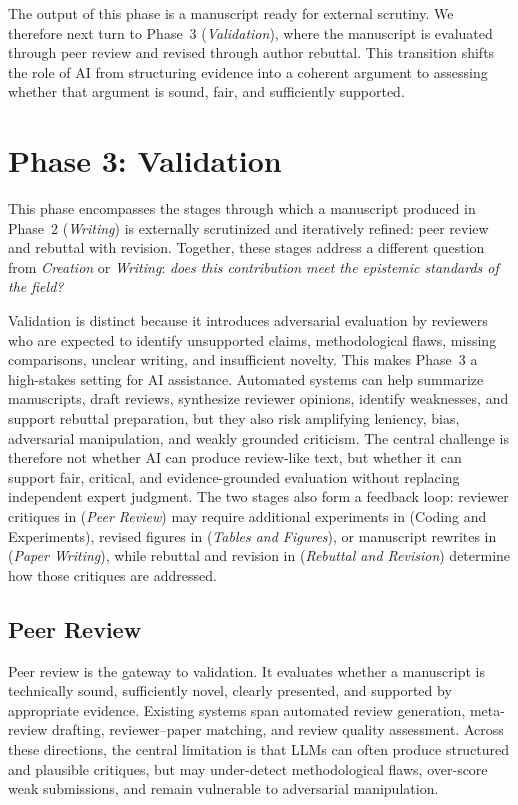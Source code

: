 \documentclass{llmxive}
\providecommand{\levelbadge}[2]{  \tcbox[on line, nobeforeafter, tcbox raise base,
         boxsep=0pt, left=2pt, right=2pt, top=0.5pt, bottom=0.5pt,
         arc=1.5pt, boxrule=0.3pt,
         colback=#1!15, colframe=#1!70]    {\scriptsize\bfseries\sffamily#2}}
\providecommand{\Sthree}{\texorpdfstring{\levelbadge{S3color}{S3}}{S3}\xspace}
\providecommand{\Sfour}{\texorpdfstring{\levelbadge{S4color}{S4}}{S4}\xspace}
\providecommand{\Sfive}{\texorpdfstring{\levelbadge{S5color}{S5}}{S5}\xspace}
\providecommand{\Ssix}{\texorpdfstring{\levelbadge{S6color}{S6}}{S6}\xspace}
\providecommand{\Sseven}{\texorpdfstring{\levelbadge{S7color}{S7}}{S7}\xspace}
\begin{document}
The output of this phase is a manuscript ready for external scrutiny. We therefore next turn to Phase~3 (\emph{Validation}), where the manuscript is evaluated through peer review and revised through author rebuttal. This transition shifts the role of AI from structuring evidence into a coherent argument to assessing whether that argument is sound, fair, and sufficiently supported.
\section{Phase 3: Validation}
\label{sec:validation}

This phase encompasses the stages through which a manuscript produced in Phase~2 (\emph{Writing}) is externally scrutinized and iteratively refined: peer review and rebuttal with revision. Together, these stages address a different question from \emph{Creation} or \emph{Writing}: \emph{does this contribution meet the epistemic standards of the field?}

Validation is distinct because it introduces adversarial evaluation by reviewers who are expected to identify unsupported claims, methodological flaws, missing comparisons, unclear writing, and insufficient novelty. This makes Phase~3 a high-stakes setting for AI assistance. Automated systems can help summarize manuscripts, draft reviews, synthesize reviewer opinions, identify weaknesses, and support rebuttal preparation, but they also risk amplifying leniency, bias, adversarial manipulation, and weakly grounded criticism. The central challenge is therefore not whether AI can produce review-like text, but whether it can support fair, critical, and evidence-grounded evaluation without replacing independent expert judgment. The two stages also form a feedback loop: reviewer critiques in \Ssix (\emph{Peer Review}) may require additional experiments in \Sthree (Coding and Experiments), revised figures in \Sfour (\emph{Tables and Figures}), or manuscript rewrites in \Sfive (\emph{Paper Writing}), while rebuttal and revision in \Sseven (\emph{Rebuttal and Revision}) determine how those critiques are addressed.



\subsection{Peer Review}
\label{sec:peer_review}

Peer review is the gateway to validation. It evaluates whether a manuscript is technically sound, sufficiently novel, clearly presented, and supported by appropriate evidence. Existing systems span automated review generation, meta-review drafting, reviewer--paper matching, and review quality assessment. Across these directions, the central limitation is that LLMs can often produce structured and plausible critiques, but may under-detect methodological flaws, over-score weak submissions, and remain vulnerable to adversarial manipulation. 
\end{document}
